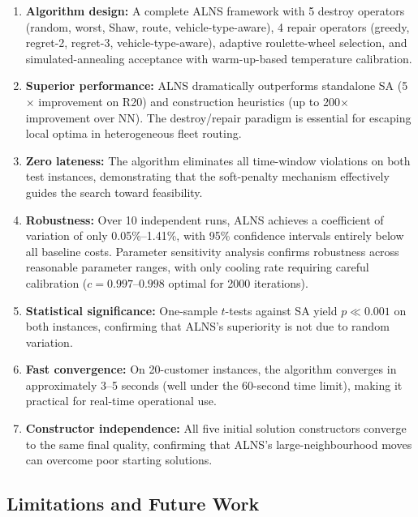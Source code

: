 \documentclass[11pt]{article}
\begin{document}
\begin{enumerate}[leftmargin=*]
    \item \textbf{Algorithm design:} A complete ALNS framework with 5 destroy operators (random, worst, Shaw, route, vehicle-type-aware), 4 repair operators (greedy, regret-2, regret-3, vehicle-type-aware), adaptive roulette-wheel selection, and simulated-annealing acceptance with warm-up-based temperature calibration.

    \item \textbf{Superior performance:} ALNS dramatically outperforms standalone SA (5$\times$ improvement on R20) and construction heuristics (up to 200$\times$ improvement over NN). The destroy/repair paradigm is essential for escaping local optima in heterogeneous fleet routing.

    \item \textbf{Zero lateness:} The algorithm eliminates all time-window violations on both test instances, demonstrating that the soft-penalty mechanism effectively guides the search toward feasibility.

    \item \textbf{Robustness:} Over 10 independent runs, ALNS achieves a coefficient of variation of only 0.05\%--1.41\%, with 95\% confidence intervals entirely below all baseline costs. Parameter sensitivity analysis confirms robustness across reasonable parameter ranges, with only cooling rate requiring careful calibration ($c = 0.997$--$0.998$ optimal for 2000 iterations).

    \item \textbf{Statistical significance:} One-sample $t$-tests against SA yield $p \ll 0.001$ on both instances, confirming that ALNS's superiority is not due to random variation.

    \item \textbf{Fast convergence:} On 20-customer instances, the algorithm converges in approximately 3--5 seconds (well under the 60-second time limit), making it practical for real-time operational use.

    \item \textbf{Constructor independence:} All five initial solution constructors converge to the same final quality, confirming that ALNS's large-neighbourhood moves can overcome poor starting solutions.
\end{enumerate}

\subsection{Limitations and Future Work}
\end{document}
